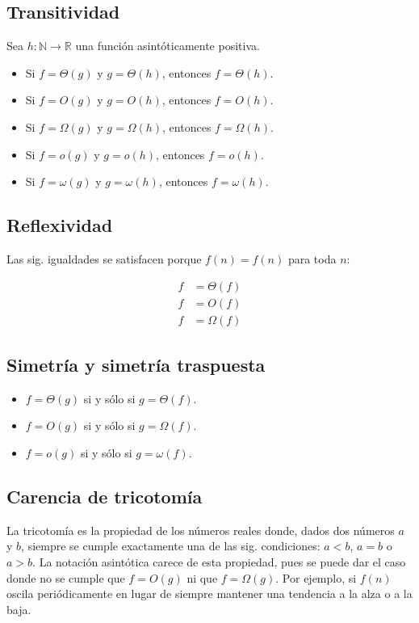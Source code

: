 \subsection{Transitividad}

Sea $h:\mathbb{N}\to\mathbb{R}$ una función asintóticamente positiva. 

\begin{itemize}
    \item Si $f=\Theta(g)$ y $g=\Theta(h)$, entonces $f=\Theta(h)$.
    \item Si $f=O(g)$ y $g=O(h)$, entonces $f=O(h)$. 
    \item Si $f=\Omega(g)$ y $g=\Omega(h)$, entonces $f=\Omega(h)$.
    \item Si $f=o(g)$ y $g=o(h)$, entonces $f=o(h)$.
    \item Si $f=\omega(g)$ y $g=\omega(h)$, entonces $f=\omega(h)$.
\end{itemize}

\subsection{Reflexividad}

Las sig. igualdades se satisfacen porque $f(n)=f(n)$ para toda $n$:

\[
    \begin{aligned}
        f &= \Theta(f)\\
        f &= O(f)\\
        f &= \Omega(f)
    \end{aligned}
\]


\subsection{Simetría y simetría traspuesta}

\begin{itemize}
    \item $f=\Theta(g)$ si y sólo si $g=\Theta(f)$.
    \item $f=O(g)$ si y sólo si $g=\Omega(f)$.
    \item $f=o(g)$ si y sólo si $g=\omega(f)$.
\end{itemize}

\subsection{Carencia de tricotomía}

La tricotomía es la propiedad de los números reales donde, dados dos
números $a$ y $b$, siempre se cumple exactamente una de las sig.
condiciones: $a<b$, $a=b$ o $a>b$. La notación asintótica carece
de esta propiedad, pues se puede dar el caso donde no se cumple
que $f=O(g)$ ni que $f=\Omega(g)$. Por ejemplo, si $f(n)$ oscila
periódicamente en lugar de siempre mantener una tendencia a la alza
o a la baja.

